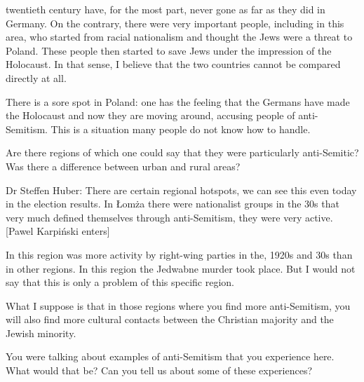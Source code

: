 twentieth century have, for the most part, never gone as far as they did in Germany. On the contrary, there were very important people, including in this area, who started from racial nationalism and thought the Jews were a threat to Poland. These people then started to save Jews under the impression of the Holocaust. In that sense, I believe that the two countries cannot be compared directly at all. 

There is a sore spot in Poland: one has the feeling that the Germans have made the Holocaust and now they are moving around, accusing people of anti-Semitism. This is a situation many people do not know how to handle. 

 

Are there regions of which one could say that they were particularly anti-Semitic? Was there a difference between urban and rural areas? 

 

Dr Steffen Huber: There are certain regional hotspots, we can see this even today in the election results. In Łomża there were nationalist groups in the 30s that very much defined themselves through anti-Semitism, they were very active. [Pawel Karpiński enters] 

In this region was more activity by right-wing parties in the, 1920s and 30s than in other regions. In this region the Jedwabne murder took place. But I would not say that this is only a problem of this specific region. 

What I suppose is that in those regions where you find more anti-Semitism, you will also find more cultural contacts between the Christian majority and the Jewish minority. 

 

 You were talking about examples of anti-Semitism that you experience here. What would that be? Can you tell us about some of these experiences? 

 


